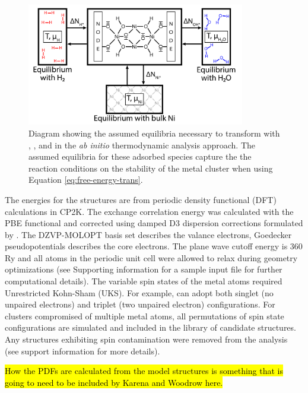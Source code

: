 \documentclass[journal=jctcce,manuscript=article]{achemso}
\begin{document}
\begin{figure}[H]
    \centering
    \includegraphics[width=0.85\textwidth]{zi-images/00-General-Graphics/FPT-schematic-full.png}
    \caption{Diagram showing the assumed equilibria necessary to transform with , , and  in the \textit{ab initio} thermodynamic analysis approach. The assumed equilibria for these adsorbed species capture the the reaction conditions on the stability of the metal cluster when using Equation \ref{eq:free-energy-trans}.}
    \label{fig:FPT-process}
\end{figure}

The energies for the structures are from periodic density functional (DFT) calculations in CP2K.\cite{Hutter2014} The exchange correlation energy was calculated with the PBE functional\cite{Perdew1996} and corrected using damped D3 dispersion corrections formulated by \citeauthor{Grimme2010}.\cite{Grimme2010} The DZVP-MOLOPT basis set describes the valance electrons, Goedecker pseudopotentials\cite{Goedecker1996} describes the core electrons. The plane wave cutoff energy is 360 Ry and  all atoms in the periodic unit cell were allowed to relax during geometry optimizations (see Supporting information for a sample input file for further computational details). The variable spin states of the metal atoms required Unrestricted Kohn-Sham (UKS). For example,  can adopt both singlet (no unpaired electrons) and triplet (two unpaired electron) configurations. For clusters compromised of multiple metal atoms, all permutations of spin state configurations are simulated and included in the library of candidate structures. Any structures exhibiting spin contamination were removed from the analysis (see support information for more details).

\hl{How the PDFs are calculated from the model structures is something that is going to need to be included by Karena and Woodrow here.}
\end{document}
